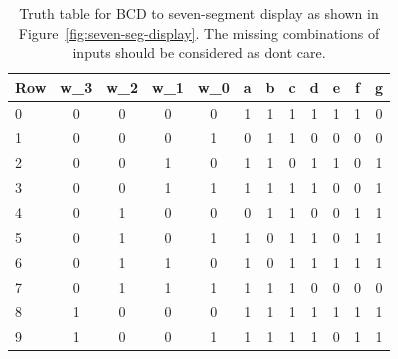 \documentclass[twocolumn]{article}
\begin{document}
\begin{table}
  \footnotesize
\begin{tabular}{l|cccc||ccccccc}
  \toprule
  Row & w_3 & w_2 & w_1 & w_0 & a & b & c & d & e & f & g \\
  \midrule
  0  & 0    & 0   &   0 &   0 & 1 & 1 & 1 & 1 & 1 & 1 & 0 \\
  1  & 0    & 0   &   0 &   1 & 0 & 1 & 1 & 0 & 0 & 0 & 0 \\
  2  & 0    & 0   &   1 &   0 & 1 & 1 & 0 & 1 & 1 & 0 & 1 \\ 
  3  & 0    & 0   &   1 &   1 & 1 & 1 & 1 & 1 & 0 & 0 & 1 \\ 
  4  & 0    & 1   &   0 &   0 & 0 & 1 & 1 & 0 & 0 & 1 & 1 \\ 
  5  & 0    & 1   &   0 &   1 & 1 & 0 & 1 & 1 & 0 & 1 & 1 \\   
  6  & 0    & 1   &   1 &   0 & 1 & 0 & 1 & 1 & 1 & 1 & 1 \\ 
  7  & 0    & 1   &   1 &   1 & 1 & 1 & 1 & 0 & 0 & 0 & 0 \\ 
  8  & 1    & 0   &   0 &   0 & 1 & 1 & 1 & 1 & 1 & 1 & 1 \\
  9  & 1    & 0   &   0 &   1 & 1 & 1 & 1 & 1 & 0 & 1 & 1 \\
  \bottomrule
\end{tabular}
\caption{Truth table for BCD to seven-segment display as shown in
  Figure~\ref{fig:seven-seg-display}. The missing combinations of inputs should
  be considered as dont care.}
\label{tab:seven-segment-tt}
\end{table}



\end{document}
